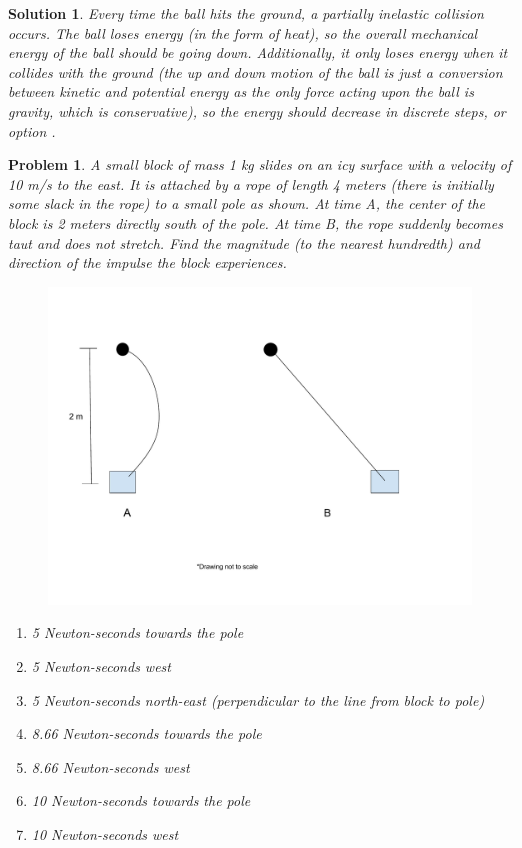 \documentclass[12pt]{article}
\newcommand{\clearpts}{\addtocounter{tpts}{\value{cpts}} \setcounter{cpts}{0}}
\newcommand{\pts}[1]{\clearpts \setcounter{cpts}{#1}}
\newtheorem*{solution}{Solution}
\theoremstyle{mystyle}
\newtheorem{pproblem}{Problem}
\begin{document}
\begin{solution}
    Every time the ball hits the ground, a partially inelastic collision occurs. The ball loses energy (in the form of heat), so the overall mechanical energy of the ball should be going down. Additionally, it only loses energy when it collides with the ground (the up and down motion of the ball is just a conversion between kinetic and potential energy as the only force acting upon the ball is gravity, which is conservative), so the energy should decrease in discrete steps, or option .
\end{solution}

\pts{2}
\begin{pproblem}
    A small block of mass 1 kg slides on an icy surface with a velocity of 10 m/s to the east. It is attached by a rope of length 4 meters (there is initially some slack in the rope) to a small pole as shown. At time A, the center of the block is 2 meters directly south of the pole. At time B, the rope suddenly becomes taut and does not stretch. Find the magnitude (to the nearest hundredth) and direction of the impulse the block experiences.
    \begin{figure}[H]
        \centering
        \includegraphics[scale=0.6]{images/block_and_pole.pdf}
    \end{figure}
    \begin{enumerate}[label=\Alph*)]
        \item 5 Newton-seconds towards the pole
        \item 5 Newton-seconds west
        \item 5 Newton-seconds north-east (perpendicular to the line from block to pole)
        \item 8.66 Newton-seconds towards the pole
        \item 8.66 Newton-seconds west
        \item 10 Newton-seconds towards the pole
        \item 10 Newton-seconds west
    \end{enumerate}
\end{pproblem}
\end{document}
